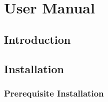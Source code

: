 \chapter{User Manual}

\section{Introduction}

\section{Installation}

\subsection{Prerequisite Installation}
\label{Prerequisite_Installation}

